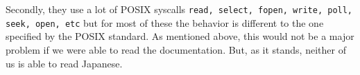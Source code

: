 \documentclass{scrartcl}
\begin{document}
Secondly, they use a lot of POSIX syscalls \texttt{read, select, fopen, write, poll, seek, open, etc} but for most of these the behavior is different to the one specified by the POSIX standard.
As mentioned above, this would not be a major problem if we were able to read the documentation.
But, as it stands, neither of us is able to read Japanese.
\end{document}

